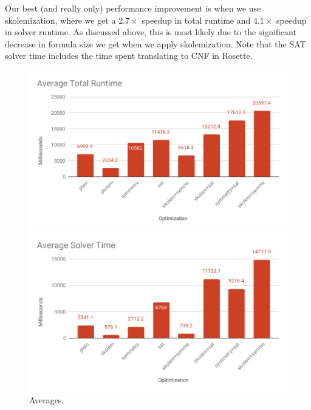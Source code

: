 \documentclass[10pt]{article}
\theoremstyle{definition}
\begin{document}
  Our best (and really only) performance improvement is when we use skolemization, where we get a $2.7\times$ speedup in total runtime and $4.1\times$ speedup in solver runtime. As discussed above, this is most likely due to the significant decrease in formula size we get when we apply skolemization. Note that the SAT solver time includes the time spent translating to CNF in Rosette.

    \begin{figure}[h]
      \centering
      \begin{minipage}{.5\textwidth}
        \centering
        \includegraphics[width=\textwidth]{avg_total.pdf}   
      \end{minipage}\hfill
      \begin{minipage}{.5\textwidth}
        \centering
        \includegraphics[width=\textwidth]{avg_solver.pdf}   
      \end{minipage}
      \caption{Averages.}
      \label{fig:averages}
    \end{figure}
\end{document}
